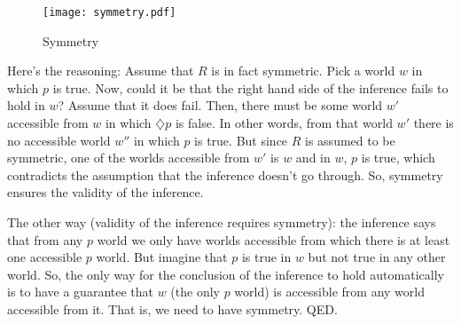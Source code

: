 %
\begin{figure}[htbp]
  \centering
    \texttt{[image: symmetry.pdf]}
  \caption{Symmetry}
  \label{fig:symmetry}
\end{figure}
%
Here's the reasoning: Assume that $R$ is in fact symmetric. Pick a world $w$ in
which $p$ is true. Now, could it be that the right hand side of the inference
fails to hold in $w$? Assume that it does fail. Then, there must be some world
$w'$ accessible from $w$ in which $\diamondsuit p$ is false. In other words,
from that world $w'$ there is no accessible world $w''$ in which $p$ is true.
But since $R$ is assumed to be symmetric, one of the worlds accessible from $w'$
is $w$ and in $w$, $p$ is true, which contradicts the assumption that the
inference doesn't go through. So, symmetry ensures the validity of the
inference.

The other way (validity of the inference requires symmetry): the inference says
that from any $p$ world we only have worlds accessible from which there is at
least one accessible $p$ world. But imagine that $p$ is true in $w$ but not true
in any other world. So, the only way for the conclusion of the inference to hold
automatically is to have a guarantee that $w$ (the only $p$ world) is accessible
from any world accessible from it. That is, we need to have symmetry. QED.

